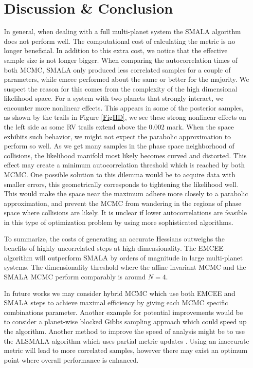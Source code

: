 \documentclass{aa}
\begin{document}
\section{Discussion \& Conclusion}
In general, when dealing with a full multi-planet system the SMALA algorithm does not perform well. The computational cost of calculating the metric is no longer beneficial. In addition to this extra cost, we notice that the effective sample size is not longer bigger. When comparing the autocorrelation times of both MCMC, SMALA only produced less correlated samples for a couple of parameters, while emcee performed about the same or better for the majority. We suspect the reason for this comes from the complexity of the high dimensional likelihood space. For a system with two planets that strongly interact, we encounter more nonlinear effects. This appears in some of the posterior samples, as shown by the trails in Figure \ref{FigHD}, we see these strong nonlinear effects on the left side as some RV trails extend above the $0.002$ mark. When the space exhibits such behavior, we might not expect the parabolic approximation to perform so well. As we get many samples in the phase space neighborhood of collisions, the likelihood manifold most likely becomes curved and distorted. This effect may create a minimum autocorrelation threshold which is reached by both MCMC. One possible solution to this dilemma would be to acquire data with smaller errors, this geometrically corresponds to tightening the likelihood well. This would make the space near the maximum adhere more closely to a parabolic approximation, and prevent the MCMC from wandering in the regions of phase space where collisions are likely. It is unclear if lower autocorrelations are feasible in this type of optimization problem by using more sophisticated algorithms.

To summarize, the costs of generating an accurate Hessians outweighs the benefits of highly uncorrelated steps at high dimensionality. The EMCEE algorithm will outperform SMALA by orders of magnitude in large multi-planet systems. The dimensionality threshold where the affine invariant MCMC and the SMALA MCMC perform comparably is around $N = 4$. 

In future works we may consider hybrid MCMC which use both EMCEE and SMALA steps to achieve maximal efficiency by giving each MCMC specific combinations parameter. Another example for potential improvements would be to consider a planet-wise blocked Gibbs sampling approach which could speed up the algorithm. Another method to improve the speed of analysis might be to use the ALSMALA algorithm which uses partial metric updates \cite{1608.07986}. Using an inaccurate metric will lead to more correlated samples, however there may exist an optimum point where overall performance is enhanced.
\end{document}
